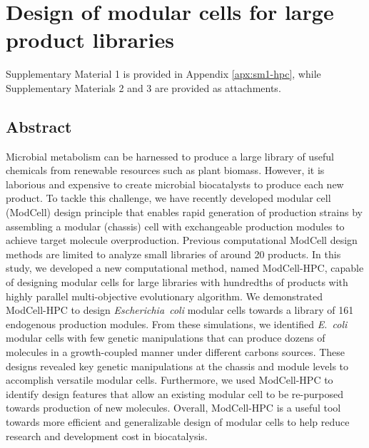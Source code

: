\chapter{Design of modular cells for large product libraries}
\label{ch:hpc}

Supplementary Material 1 is provided in Appendix \ref{apx:sm1-hpc}, while Supplementary Materials 2 and 3 are provided as attachments.

\section*{Abstract}
    Microbial metabolism can be harnessed to produce a large library of useful chemicals from renewable resources such as plant biomass.
However, it is laborious and expensive to create microbial biocatalysts to produce each new product.
    To tackle this challenge, we have recently developed modular cell (ModCell) design principle that enables rapid generation of production strains by assembling a modular (chassis) cell with exchangeable production modules to achieve target molecule overproduction.
    Previous computational ModCell design methods are limited to analyze small libraries of around 20 products.
In this study, we developed a new computational method, named ModCell-HPC, capable of designing modular cells for large libraries with hundredths of products with highly parallel multi-objective evolutionary algorithm.
    We demonstrated ModCell-HPC to design \textit{Escherichia~coli} modular cells towards a library of 161 endogenous production modules.
    From these simulations, we identified \textit{E.~coli} modular cells with few genetic manipulations that can produce dozens of molecules in a growth-coupled manner under different carbons sources.
    These designs revealed key genetic manipulations at the chassis and module levels to accomplish versatile modular cells.
    Furthermore, we used ModCell-HPC to identify design features that allow an existing modular cell to be re-purposed towards production of new molecules.
    Overall, ModCell-HPC is a useful tool towards more efficient and generalizable design of modular cells to help reduce research and development cost in biocatalysis.


